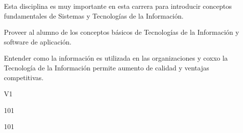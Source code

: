 ﻿\begin{syllabus}


\begin{justification}
Esta disciplina es muy importante en esta carrera para introducir conceptos fundamentales de Sistemas y Tecnologías de la Información.
\end{justification}

\begin{goals}
\item Proveer al alumno de los conceptos básicos de Tecnologías de la Información y software de aplicación.
\item Entender como la información es utilizada en las organizaciones y coxxo la Tecnología de la Información permite aumento de calidad y ventajas competitivas.
\end{goals}

\begin{outcomes}{V1}
\end{outcomes}

\begin{unit}{\LUFIVEDef}{}{\LUFIVEBib}{10}{1}
   \begin{topics}
      \item \OMCTWOTopicTWOxTWOxONEOH
      \item \TDSONETopicTHREExONExONE
      \item \TDSONETopicTHREExONExTWO
      \item \TDSONETopicTHREExONExTHREE
      \item \TDSONETopicTHREExONExFOUR
      \item \TDSONETopicTHREExONExFIVE
   \end{topics}
	\LUFIVEGoal
\end{unit}

\begin{unit}{\LUSIXDef}{}{\LUSIXBib}{10}{1}
   \begin{topics}
      \item \OMCTHREETopicTWOxTHREExONE
      \item \OMCTHREETopicTWOxTHREExTWO
      \item \OMCTHREETopicTWOxTHREExTHREE
   \end{topics}
	\LUSIXGoal
\end{unit}


\end{syllabus}
